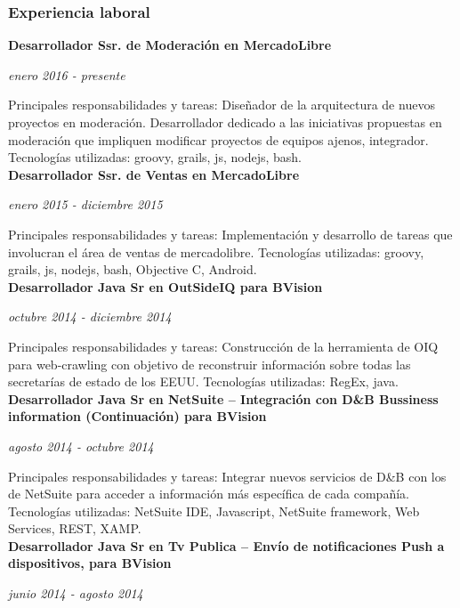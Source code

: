 \documentclass[a4paper,11pt]{article}
\begin{document}
\subsubsection{Experiencia laboral}

\noindent \textbf{Desarrollador Ssr. de Moderación en MercadoLibre}

\noindent \emph{enero 2016 - presente}

\noindent Principales responsabilidades y tareas: Diseñador de la arquitectura
de nuevos proyectos en moderación. Desarrollador dedicado a las iniciativas
propuestas en moderación que impliquen modificar proyectos de equipos ajenos,
integrador. Tecnologías utilizadas: groovy, grails, js, nodejs, bash. \\

\noindent \textbf{Desarrollador Ssr. de Ventas en MercadoLibre}

\noindent \emph{enero 2015 - diciembre 2015}

\noindent Principales responsabilidades y tareas: Implementación y desarrollo
de tareas que involucran el área de ventas de mercadolibre.  Tecnologías
utilizadas: groovy, grails, js, nodejs, bash, Objective C, Android. \\

\noindent \textbf{Desarrollador Java Sr en OutSideIQ para BVision}

\noindent \emph{octubre 2014 - diciembre 2014}

\noindent Principales responsabilidades y tareas: Construcción de la
herramienta de OIQ para web-crawling con objetivo de reconstruir información
sobre todas las secretarías de estado de los EEUU.  Tecnologías utilizadas:
RegEx, java. \\

\noindent \textbf{Desarrollador Java Sr en NetSuite – Integración con D\&B
Bussiness information (Continuación) para BVision}

\noindent \emph{agosto 2014 - octubre 2014}

\noindent Principales responsabilidades y tareas: Integrar nuevos servicios de
D\&B con los de NetSuite para acceder a información más específica de cada
compañía.  Tecnologías utilizadas: NetSuite IDE, Javascript, NetSuite
framework, Web Services, REST, XAMP. \\

\noindent \textbf{Desarrollador Java Sr en Tv Publica – Envío de notificaciones
Push a dispositivos, para BVision}

\noindent \emph{junio 2014 - agosto 2014}
\end{document}
